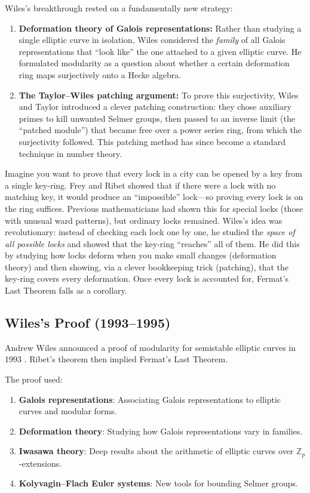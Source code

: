 Wiles's breakthrough rested on a fundamentally new strategy:
\begin{enumerate}
\item \textbf{Deformation theory of Galois representations:} Rather than studying a single elliptic curve in isolation, Wiles considered the \emph{family} of all Galois representations that ``look like'' the one attached to a given elliptic curve. He formulated modularity as a question about whether a certain deformation ring maps surjectively onto a Hecke algebra.
\item \textbf{The Taylor--Wiles patching argument:} To prove this surjectivity, Wiles and Taylor introduced a clever patching construction: they chose auxiliary primes to kill unwanted Selmer groups, then passed to an inverse limit (the ``patched module'') that became free over a power series ring, from which the surjectivity followed. This patching method has since become a standard technique in number theory.
\end{enumerate}

Imagine you want to prove that every lock in a city can be opened by a key from a single key-ring. Frey and Ribet showed that if there were a lock with no matching key, it would produce an ``impossible'' lock---so proving every lock is on the ring suffices. Previous mathematicians had shown this for special locks (those with unusual ward patterns), but ordinary locks remained. Wiles's idea was revolutionary: instead of checking each lock one by one, he studied the \emph{space of all possible locks} and showed that the key-ring ``reaches'' all of them. He did this by studying how locks deform when you make small changes (deformation theory) and then showing, via a clever bookkeeping trick (patching), that the key-ring covers every deformation. Once every lock is accounted for, Fermat's Last Theorem falls as a corollary.

\bigskip

\subsection{Wiles's Proof (1993--1995)}

Andrew Wiles announced a proof of modularity for semistable elliptic curves in 1993 \cite{wiles1995}. Ribet's theorem then implied Fermat's Last Theorem.

The proof used:

\begin{enumerate}
\item \textbf{Galois representations}: Associating Galois representations to elliptic curves and modular forms.
\item \textbf{Deformation theory}: Studying how Galois representations vary in families.
\item \textbf{Iwasawa theory}: Deep results about the arithmetic of elliptic curves over $\mathbb{Z}_p$-extensions.
\item \textbf{Kolyvagin--Flach Euler systems}: New tools for bounding Selmer groups.
\end{enumerate}

